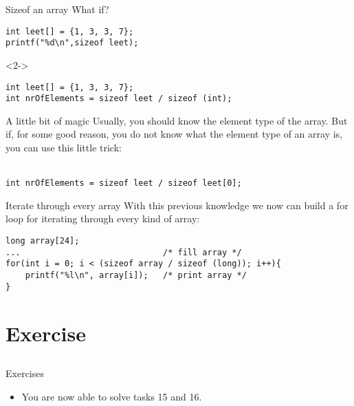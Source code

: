 \begin{frame}[fragile]{Sizeof an array}
	What if?
	\begin{lstlisting}[numbers=none]
int leet[] = {1, 3, 3, 7};
printf("%d\n",sizeof leet);
\end{lstlisting}
	
	\begin{uncoverenv}<2->
		\begin{lstlisting}[numbers=none]
int leet[] = {1, 3, 3, 7};
int nrOfElements = sizeof leet / sizeof (int);
\end{lstlisting}
	\end{uncoverenv}
\end{frame}

\begin{frame}[fragile]{A little bit of magic}
Usually, you should know the element type of the array.	
But if, for some good reason, you do not know what the element type of an array is, you can use this little trick: \ \\\ \\
\begin{lstlisting}
int nrOfElements = sizeof leet / sizeof leet[0];
\end{lstlisting}
\end{frame}

\begin{frame}[fragile]{Iterate through every array}
	With this previous knowledge we now can build a for loop for iterating through every kind of array:
	\begin{lstlisting}[numbers=none]
long array[24];
...								/* fill array */
for(int i = 0; i < (sizeof array / sizeof (long)); i++){
	printf("%l\n", array[i]);	/* print array */
}
\end{lstlisting}
\end{frame}
\section{Exercise}
\subsection{}
\begin{frame}{Exercises}
	\begin{itemize}
		\item You are now able to solve tasks 15 and 16.
	\end{itemize}
\end{frame}

